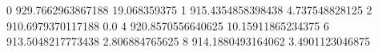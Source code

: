 0 929.7662963867188 19.068359375
1 915.4354858398438 4.737548828125
2 910.6979370117188 0.0
4 920.8570556640625 10.15911865234375
6 913.5048217773438 2.806884765625
8 914.1880493164062 3.4901123046875
